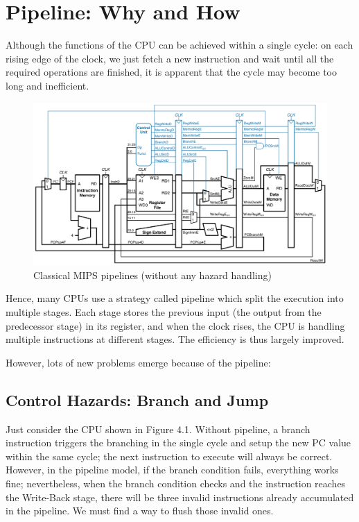 \documentclass[a4paper,12pt, oneside]{book}
\begin{document}
\section{Pipeline: Why and How}
Although the functions of the CPU can be achieved within a single cycle: on each rising edge of the clock, we just fetch a new instruction and wait until all the required operations are finished, it is apparent that the cycle may become too long and inefficient. 
\begin{figure}[H]
	\centering
	\includegraphics[width=\linewidth]{pipeline}
	\caption{Classical MIPS pipelines (without any hazard handling)}
\end{figure}
Hence, many CPUs use a strategy called pipeline which split the execution into multiple stages. Each stage stores the previous input (the output from the predecessor stage) in its register, and when the clock rises, the CPU is handling multiple instructions at different stages. The efficiency is thus largely improved.

However, lots of new problems emerge because of the pipeline:
\subsection{Control Hazards: Branch and Jump}
Just consider the CPU shown in Figure 4.1. Without pipeline, a branch instruction triggers the branching in the single cycle and setup the new PC value within the same cycle; the next instruction to execute will always be correct. However, in the pipeline model, if the branch condition fails, everything works fine; nevertheless, when the branch condition checks and the instruction reaches the Write-Back stage, there will be three invalid instructions already accumulated in the pipeline. We must find a way to flush those invalid ones.
\end{document}
